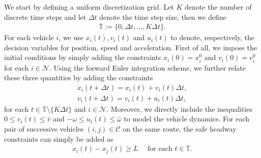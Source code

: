 \documentclass[a4paper]{report}
\theoremstyle{definition}
\theoremstyle{plain}
\begin{document}
We start by defining a uniform discretization grid. Let $K$ denote the number of
discrete time steps and let $\Delta t$ denote the time step size, then we define
\begin{align}
  \mathbb{T} := \{0, \Delta t, \dots, K \Delta t\} .
\end{align}
%
For each vehicle $i$, we use $x_{i}(t), v_{i}(t)$ and $u_{i}(t)$ to denote,
respectively, the decision variables for position, speed and acceleration.
%
First of all, we impose the initial conditions by simply adding the constraints
$x_{i}(0) = x_{i}^{0}$ and $v_{i}(0) = v_{i}^{0}$ for each $i \in \mathcal{N}$.
%
Using the forward Euler integration scheme, we further relate these three
quantities by adding the constraints
\begin{subequations}
\begin{align}
  x_{i}(t + \Delta t) = x_{i}(t) + v_{i}(t) \Delta t , \\
  v_{i}(t + \Delta t) = v_{i}(t) + u_{i}(t) \Delta t ,
\end{align}
\end{subequations}
for each $t \in \mathbb{T} \setminus \{K\Delta t\}$ and $i \in \mathcal{N}$. Moreover, we directly include
the inequalities $0 \leq v_{i}(t) \leq \bar{v}$ and
${-\omega} \leq u_{i}(t) \leq \bar{\omega}$ to model the vehicle dynamics.
%
For each pair of successive vehicles $(i, j) \in \mathcal{C}$ on the same route,
the safe headway constraints can simply be added as
\begin{align}
  x_{i}(t) - x_{j}(t) \geq L \quad \text{ for each } t \in \mathbb{T}.
\end{align}
\end{document}
